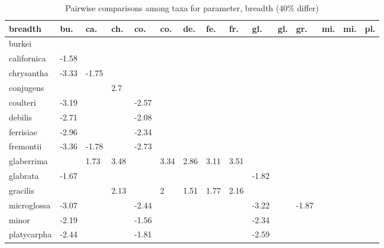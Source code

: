 \begin{table}[ht]
\centering
\caption{Pairwise comparisons among taxa for parameter, breadth (40\% differ)} 
\begin{tabular}{lllllllllllllll}
  \hline
breadth & bu. & ca. & ch. & co. & co. & de. & fe. & fr. & gl. & gl. & gr. & mi. & mi. & pl. \\ 
  \hline
burkei &  &  &  &  &  &  &  &  &  &  &  &  &  &  \\ 
  californica & -1.58 &  &  &  &  &  &  &  &  &  &  &  &  &  \\ 
  chrysantha & -3.33 & -1.75 &  &  &  &  &  &  &  &  &  &  &  &  \\ 
  conjugens &  &  & 2.7 &  &  &  &  &  &  &  &  &  &  &  \\ 
  coulteri & -3.19 &  &  & -2.57 &  &  &  &  &  &  &  &  &  &  \\ 
  debilis & -2.71 &  &  & -2.08 &  &  &  &  &  &  &  &  &  &  \\ 
  ferrisiae & -2.96 &  &  & -2.34 &  &  &  &  &  &  &  &  &  &  \\ 
  fremontii & -3.36 & -1.78 &  & -2.73 &  &  &  &  &  &  &  &  &  &  \\ 
  glaberrima &  & 1.73 & 3.48 &  & 3.34 & 2.86 & 3.11 & 3.51 &  &  &  &  &  &  \\ 
  glabrata & -1.67 &  &  &  &  &  &  &  & -1.82 &  &  &  &  &  \\ 
  gracilis &  &  & 2.13 &  & 2 & 1.51 & 1.77 & 2.16 &  &  &  &  &  &  \\ 
  microglossa & -3.07 &  &  & -2.44 &  &  &  &  & -3.22 &  & -1.87 &  &  &  \\ 
  minor & -2.19 &  &  & -1.56 &  &  &  &  & -2.34 &  &  &  &  &  \\ 
  platycarpha & -2.44 &  &  & -1.81 &  &  &  &  & -2.59 &  &  &  &  &  \\ 
   \hline
\end{tabular}
\end{table}
